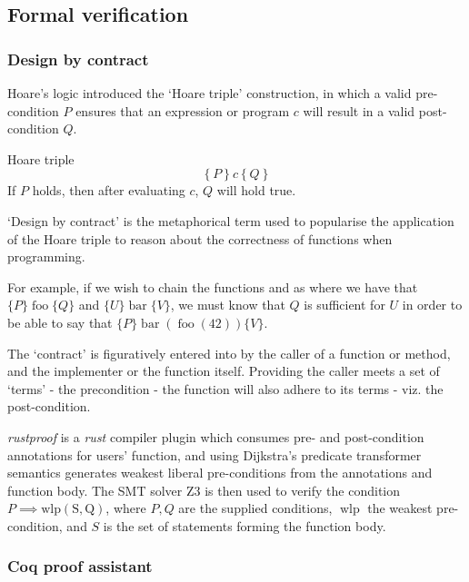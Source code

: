 \subsection{Formal verification} \label{bg:verification}

\subsubsection{Design by contract} \label{bg:verification:dbc}

Hoare's logic introduced the `Hoare triple' construction, in which a valid pre-condition $P$ ensures that an expression or program $c$ will result in a valid post-condition $Q$. \cite{hoare_logic}

\begin{defn}Hoare triple \label{def:bg:verification:dbc:hoare-triple}
\[
    \left\{P\right\} c \left\{Q\right\}
\] If $P$ holds, then after evaluating $c$, $Q$ will hold true.
\end{defn}

`Design by contract' is the metaphorical term used to popularise the application of the Hoare triple to reason about the correctness of functions when programming.

For example, if we wish to chain the functions  and  as  where we have that $\{P\}\operatorname{foo}\{Q\}$ and $\{U\}\operatorname{bar}\{V\}$, we must know that $Q$ is sufficient for $U$ in order to be able to say that $\{P\} \operatorname{bar}\left(\operatorname{foo}\left(42\right)\right) \{V\}$.

The `contract' is figuratively entered into by the caller of a function or method, and the implementer or the function itself. Providing the caller meets a set of `terms' - the precondition - the function will also adhere to its terms - viz. the post-condition.

\emph{rustproof} is a \emph{rust} compiler plugin  which consumes pre- and post-condition annotations for users' function, and using Dijkstra's predicate transformer semantics generates weakest liberal pre-conditions from the annotations and function body. The SMT solver Z3 is then used to verify the condition $P \implies \operatorname{wlp(S, Q)}$, where $P,Q$ are the supplied conditions, $\operatorname{wlp}$ the weakest pre-condition, and $S$ is the set of statements forming the function body. \cite{rust_rustproof}

\subsubsection{Coq proof assistant} \label{bg:verification:coq}


